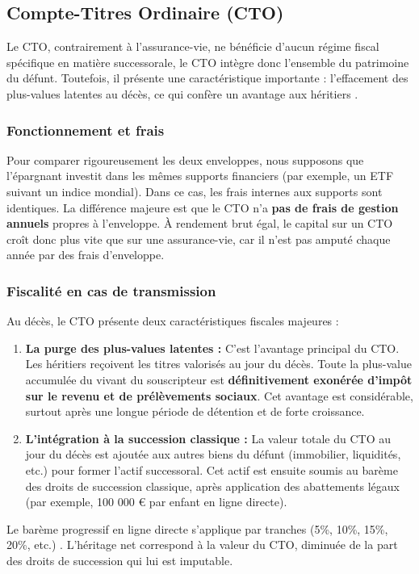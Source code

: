 \subsection{Compte-Titres Ordinaire (CTO)}
\label{sec:cto}

Le CTO, contrairement à l'assurance-vie, ne bénéficie d'aucun régime fiscal spécifique en matière successorale, le CTO intègre donc l'ensemble du patrimoine du défunt. Toutefois, il présente une caractéristique importante : l'effacement des plus-values latentes au décès, ce qui confère un avantage aux héritiers \cite{lechiquier_2019}.

\subsubsection{Fonctionnement et frais}
\label{sec:cto_evolution_capital}

Pour comparer rigoureusement les deux enveloppes, nous supposons que l'épargnant investit dans les mêmes supports financiers (par exemple, un ETF suivant un indice mondial). Dans ce cas, les frais internes aux supports sont identiques.
La différence majeure est que le CTO n'a \textbf{pas de frais de gestion annuels} propres à l'enveloppe. À rendement brut égal, le capital sur un CTO croît donc plus vite que sur une assurance-vie, car il n'est pas amputé chaque année par des frais d'enveloppe.

\subsubsection{Fiscalité en cas de transmission}
\label{sec:cto_base_taxable}

Au décès, le CTO présente deux caractéristiques fiscales majeures :
\begin{enumerate}
    \item \textbf{La purge des plus-values latentes :} C'est l'avantage principal du CTO. Les héritiers reçoivent les titres valorisés au jour du décès. Toute la plus-value accumulée du vivant du souscripteur est \textbf{définitivement exonérée d'impôt sur le revenu et de prélèvements sociaux}. Cet avantage est considérable, surtout après une longue période de détention et de forte croissance.
    \item \textbf{L'intégration à la succession classique :} La valeur totale du CTO au jour du décès est ajoutée aux autres biens du défunt (immobilier, liquidités, etc.) pour former l'actif successoral. Cet actif est ensuite soumis au barème des droits de succession classique, après application des abattements légaux (par exemple, 100 000 € par enfant en ligne directe).
\end{enumerate}

Le barème progressif en ligne directe s'applique par tranches (5\%, 10\%, 15\%, 20\%, etc.) \cite{bofip_droits_mutation_general}. L'héritage net correspond à la valeur du CTO, diminuée de la part des droits de succession qui lui est imputable.
